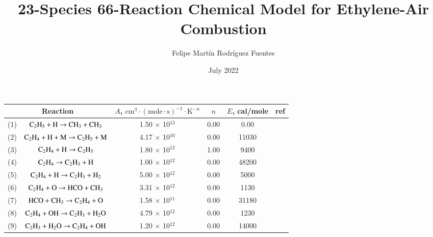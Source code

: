 \documentclass{warpdoc}
\author{
  Felipe Martín Rodríguez Fuentes
}
\title{23-Species 66-Reaction Chemical Model for Ethylene-Air
Combustion
}
\date{
  July 2022
}
\renewcommand{\fontsizetable}{\footnotesize\scalefont{0.9}}
\begin{document}
  \pagestyle{headings}
  \setcounter{page}{1}
  \makewarpdoctitle



\begin{table}[h]
\fontsizetable
\begin{center}
\begin{threeparttable}
\begin{tabular}{cccccc} 
\toprule
\multicolumn{2}{c}{Reaction \tnote{a,~b,~c}} & $A$, $\textrm{cm}^3\cdot(\textrm{mole}\cdot \textrm{s})^{-1}\cdot \textrm{K}^{-n}$ & $n$ & $E$, cal/mole & ref \\ 
\midrule
(1) & $\rm C_2 H_5 + H \rightarrow CH_3 + CH_3$  & 1.50 $\times$ 10$^{13}$  & 0.00 & 0.00  & \cite{pci:2015:saghafian}\\

(2) & $\rm C_2 H_4 + H + M\rightarrow C_2 H_5 + M$  & 4.17 $\times$ 10$^{10}$  & 0.00 & 11030&\cite{pci:2015:saghafian} \\

(3) & $\rm C_2 H_4 + H\rightarrow C_2 H_5 $ & 1.80 $\times$ 10$^{12}$  & 1.00 & 9400 &\cite{ef:2017:zettervall}\\

(4) & $\rm C_2 H_4\rightarrow C_2 H_3 +H $ & 1.00 $\times$ 10$^{12}$  & 0.00 & 48200 &\cite{ef:2017:zettervall}\\

(5) & $\rm C_2 H_4 + H \rightarrow C_2 H_3 +H_2 $ & 5.00 $\times$ 10$^{12}$  & 0.00 & 5000 &\cite{ef:2017:zettervall}\\

(6) & $\rm C_2 H_4 + O \rightarrow HCO + CH_3$ & 3.31 $\times$ 10$^{12}$  & 0.00 & 1130 & \cite{caf:1989:refael}\\

(7) & $\rm HCO + CH_3 \rightarrow C_2 H_4 + O$ & 1.58 $\times$ 10$^{11}$  & 0.00 & 31180 &\cite{caf:1989:refael}\\

(8) & $\rm C_2 H_4 + OH \rightarrow C_2 H_3 + H_2 O$ & 4.79 $\times$ 10$^{12}$  & 0.00 & 1230 &\cite{caf:1989:refael}\\

(9) & $\rm  C_2 H_3 + H_2 O \rightarrow C_2 H_4 + OH  $ & 1.20 $\times$ 10$^{12}$  & 0.00 & 14000 &\cite{caf:1989:refael}\\


\end{tabular}
\end{threeparttable}
\end{center}
\end{table}
\end{document}
